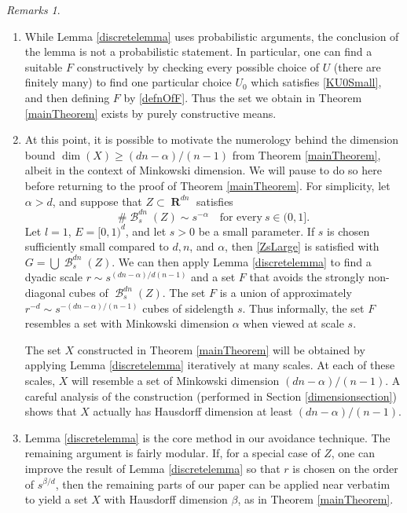 \documentclass[dvipsnames,letterpaper,12pt]{article}
\numberwithin{equation}{section}
\theoremstyle{plain}
\theoremstyle{remark}
\newtheorem*{remarks}{Remarks}
\DeclareMathOperator{\RR}{\mathbf{R}}
\DeclareMathOperator{\B}{\mathcal{B}}
\begin{document}
\begin{remarks}
	\
	\begin{enumerate}[1.]
		\item While Lemma \ref{discretelemma} uses probabilistic arguments, the conclusion of the lemma is not a probabilistic statement. In particular, one can find a suitable $F$ constructively by checking every possible choice of $U$ (there are finitely many) to find one particular choice $U_0$ which satisfies \eqref{KU0Small}, and then defining $F$ by \eqref{defnOfF}. Thus the set we obtain in Theorem \ref{mainTheorem} exists by purely constructive means.
		
		\item At this point, it is possible to motivate the numerology behind the dimension bound $\dim(X) \geq (dn-\alpha)/(n-1)$ from Theorem \ref{mainTheorem}, albeit in the context of Minkowski dimension. We will pause to do so here before returning to the proof of Theorem \ref{mainTheorem}. For simplicity, let $\alpha > d$, and suppose that $Z \subset \RR^{dn}$ satisfies 
		\begin{equation}\label{specialCase}
			\#\B_{s}^{dn}(Z) \sim s^{-\alpha} \quad \textrm{for every}\ s \in (0,1].
		\end{equation}
		Let $l = 1$, $E = [0,1)^d$, and let $s > 0$ be a small parameter. If $s$ is chosen sufficiently small compared to $d,n$, and $\alpha$, then \eqref{ZsLarge} is satisfied with $G = \bigcup \B^{dn}_s(Z)$. We can then apply Lemma \ref{discretelemma} to find a dyadic scale $r \sim s^{(dn-\alpha)/d(n-1)}$ and a set $F$ that avoids the strongly non-diagonal cubes of $\B_{s}^{dn}(Z)$. The set $F$ is a union of approximately $r^{-d} \sim s^{-(dn-\alpha)/(n-1)}$ cubes of sidelength $s$. Thus informally, the set $F$ resembles a set with Minkowski dimension $\alpha$ when viewed at scale $s$. 

		The set $X$ constructed in Theorem \ref{mainTheorem} will be obtained by applying Lemma \ref{discretelemma} iteratively at many scales. At each of these scales, $X$ will resemble a set of Minkowski dimension $(dn - \alpha)/(n-1)$. A careful analysis of the construction (performed in Section \ref{dimensionsection}) shows that $X$ actually has Hausdorff dimension at least $(dn - \alpha)/(n-1)$.

		\item Lemma \ref{discretelemma} is the core method in our avoidance technique. The remaining argument is fairly modular. If, for a special case of $Z$, one can improve the result of Lemma \ref{discretelemma} so that $r$ is chosen on the order of $s^{\beta/d}$, then the remaining parts of our paper can be applied near verbatim to yield a set $X$ with Hausdorff dimension $\beta$, as in Theorem \ref{mainTheorem}. 
	\end{enumerate} 
\end{remarks}
\end{document}
